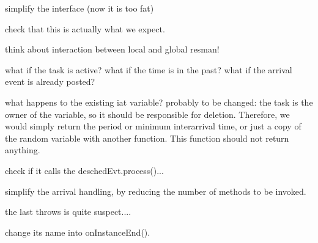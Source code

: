 \begin{DoxyRefList}
simplify the interface (now it is too fat)  
\item[\label{todo__todo000015}%
\hypertarget{todo__todo000015}{}%
Global \hyperlink{classRTSim_1_1Server_a2bd0687699ad2784928000801d8f2b47}{R\+T\+Sim\+:\+:Server\+:\+:refresh\+Exec} (double, double)]check that this is actually what we expect.  
\item[\label{todo__todo000014}%
\hypertarget{todo__todo000014}{}%
Global \hyperlink{classRTSim_1_1Server_ae157b61e75f672845db8a1c01e79e366}{R\+T\+Sim\+:\+:Server\+:\+:set\+Global\+Res\+Manager} (\hyperlink{classRTSim_1_1ResManager}{Res\+Manager} $\ast$rm)]think about interaction between local and global resman!  
\item[\label{todo__todo000020}%
\hypertarget{todo__todo000020}{}%
Global \hyperlink{classRTSim_1_1Task_a32a9f34149d023a0acd49b5ec1c5a5bd}{R\+T\+Sim\+:\+:Task\+:\+:activate} (Tick t)]what if the task is active? what if the time is in the past? what if the arrival event is already posted?  
\item[\label{todo__todo000022}%
\hypertarget{todo__todo000022}{}%
Global \hyperlink{classRTSim_1_1Task_ae1aa066bab97f7ae4fddfac5b0bf41ee}{R\+T\+Sim\+:\+:Task\+:\+:change\+I\+AT} (Random\+Var $\ast$iat)]what happens to the existing iat variable? probably to be changed\+: the task is the owner of the variable, so it should be responsible for deletion. Therefore, we would simply return the period or minimum interarrival time, or just a copy of the random variable with another function. This function should not return anything.  
\item[\label{todo__todo000024}%
\hypertarget{todo__todo000024}{}%
Global \hyperlink{classRTSim_1_1Task_a7257e6c1e400ecb13ab70e3dee8880c8}{R\+T\+Sim\+:\+:Task\+:\+:deschedule} ()]check if it calls the desched\+Evt.\+process()...  
\item[\label{todo__todo000018}%
\hypertarget{todo__todo000018}{}%
Global \hyperlink{classRTSim_1_1Task_add22c413ce6d56bd33d7d6391f688658}{R\+T\+Sim\+:\+:Task\+:\+:handle\+Arrival} (Tick arrival)]simplify the arrival handling, by reducing the number of methods to be invoked.  
\item[\label{todo__todo000021}%
\hypertarget{todo__todo000021}{}%
Global \hyperlink{classRTSim_1_1Task_aeb01f785a2a53a56fb12497894000008}{R\+T\+Sim\+:\+:Task\+:\+:kill\+Instance} ()]the last throws is quite suspect....  
\item[\label{todo__todo000016}%
\hypertarget{todo__todo000016}{}%
Global \hyperlink{classRTSim_1_1Task_a45c6a4336341c17beaba74179b168aee}{R\+T\+Sim\+:\+:Task\+:\+:on\+End\+Instance} (Meta\+Sim\+::\+Event $\ast$)]change its name into on\+Instance\+End().  

\end{DoxyRefList}
